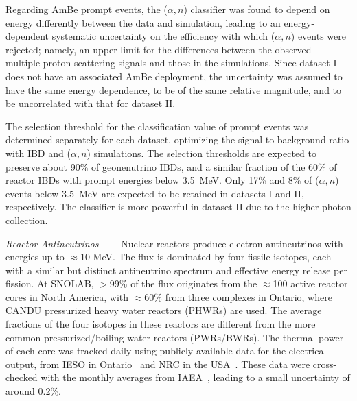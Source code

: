 \documentclass[%
 reprint,
superscriptaddress,
 amsmath,amssymb,
 aps,
]{revtex4-2}
\newcommand{\alphan}{($\alpha, n$) }
\begin{document}
Regarding AmBe prompt events, the \alphan classifier was found to depend on energy differently between the data and simulation, leading to an energy-dependent systematic uncertainty on the efficiency with which \alphan events were rejected; namely, an upper limit for the differences between the observed multiple-proton scattering signals and those in the simulations.  Since dataset I does not have an associated AmBe deployment, the uncertainty was assumed to have the same energy dependence, to be of the same relative magnitude, and to be uncorrelated with that for dataset II.

The selection threshold for the classification value of prompt events was determined separately for each dataset, optimizing the signal to background ratio with IBD and \alphan simulations. 
The selection thresholds are expected to preserve about 90\% of geonenutrino IBDs, and a similar fraction of the 60\% of reactor IBDs with prompt energies below 3.5~MeV. 
Only 17\% and 8\% of \alphan events below 3.5~MeV are expected to be retained in datasets I and II, respectively. The classifier is more powerful in dataset II due to the higher photon collection.


\smallskip
\textit{Reactor Antineutrinos}~~\textemdash~~
Nuclear reactors produce electron antineutrinos with energies up to $\approx$10 MeV. The flux is dominated by four fissile isotopes, each with a similar but distinct antineutrino spectrum and effective energy release per fission. At SNOLAB, $>$99\% of the flux originates from the $\approx$100 active reactor cores in North America, with $\approx$60\% from three complexes in Ontario, where CANDU pressurized heavy water reactors (PHWRs) are used. 
The average fractions of the four isotopes in these reactors are different from the more common pressurized/boiling water reactors (PWRs/BWRs).  The thermal power of each core was tracked daily using publicly available data for the electrical output, from IESO in Ontario~\cite{ieso} and NRC in the USA~\cite{nrc}.  These data were cross-checked with the monthly averages from IAEA~\cite{iaea}, leading to a small uncertainty of around 0.2\%.  
\end{document}
